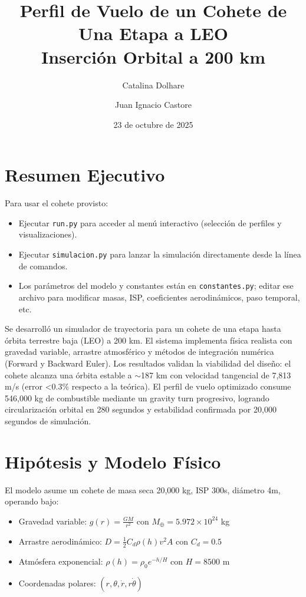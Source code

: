 \documentclass[10pt,a4paper]{article}
\title{\vspace{-1cm}\textbf{Perfil de Vuelo de un Cohete de Una Etapa a LEO}\\\large Inserción Orbital a 200 km}
\author{Catalina Dolhare \and Juan Ignacio Castore}
\date{23 de octubre de 2025}
\begin{document}
\maketitle
\thispagestyle{fancy}

\section*{Resumen Ejecutivo}
Para usar el cohete provisto:
\begin{itemize}
    \item Ejecutar \texttt{run.py} para acceder al menú interactivo (selección de perfiles y visualizaciones).
    \item Ejecutar \texttt{simulacion.py} para lanzar la simulación directamente desde la línea de comandos.
    \item Los parámetros del modelo y constantes están en \texttt{constantes.py}; editar ese archivo para modificar masas, ISP, coeficientes aerodinámicos, paso temporal, etc.
\end{itemize}
\noindent Se desarrolló un simulador de trayectoria para un cohete de una etapa hasta órbita terrestre baja (LEO) a 200 km. El sistema implementa física realista con gravedad variable, arrastre atmosférico y métodos de integración numérica (Forward y Backward Euler). Los resultados validan la viabilidad del diseño: el cohete alcanza una órbita estable a $\sim$187 km con velocidad tangencial de 7,813 m/s (error <0.3\% respecto a la teórica). El perfil de vuelo optimizado consume 546,000 kg de combustible mediante un gravity turn progresivo, logrando circularización orbital en 280 segundos y estabilidad confirmada por 20,000 segundos de simulación.

\section{Hipótesis y Modelo Físico}

El modelo asume un cohete de masa seca 20,000 kg, ISP 300s, diámetro 4m, operando bajo:
\begin{itemize}
    \item Gravedad variable: $g(r) = \frac{GM}{r^2}$ con $M_\oplus = 5.972 \times 10^{24}$ kg
    \item Arrastre aerodinámico: $D = \frac{1}{2}C_d\rho(h)v^2A$ con $C_d=0.5$
    \item Atmósfera exponencial: $\rho(h) = \rho_0 e^{-h/H}$ con $H=8500$ m
    \item Coordenadas polares: $(r, \theta, \dot{r}, r\dot{\theta})$
\end{itemize}
\end{document}
